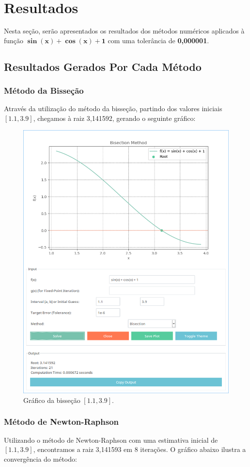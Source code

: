\section{Resultados}

Nesta seção, serão apresentados os resultados dos métodos numéricos aplicados à
função \textbf{\(\boldsymbol{\sin(x) + \cos(x) + 1}\)} com uma tolerância de
\textbf{0,000001}.

\subsection{\textbf{Resultados Gerados Por Cada Método}}

\subsubsection{\textbf{Método da Bisseção}}

Através da utilização do método da bisseção, partindo dos valores iniciais
$[1.1, 3.9]$, chegamos à raiz 3,141592, gerando o seguinte gráfico:

\begin{figure}[H]
	\centering
	\setlength{\fboxsep}{0pt}
	\includegraphics[height=0.5\textwidth]{./fig/bissecao.png}
	\caption{Gráfico da bisseção $[1.1, 3.9]$.}
	\label{fig:grafico-da-bissecao}
\end{figure}

\subsubsection{\textbf{Método de Newton-Raphson}}

Utilizando o método de Newton-Raphson com uma estimativa inicial de $[1.1,
			3.9]$, encontramos a raiz 3,141593 em 8 iterações. O gráfico abaixo ilustra a
convergência do método:

